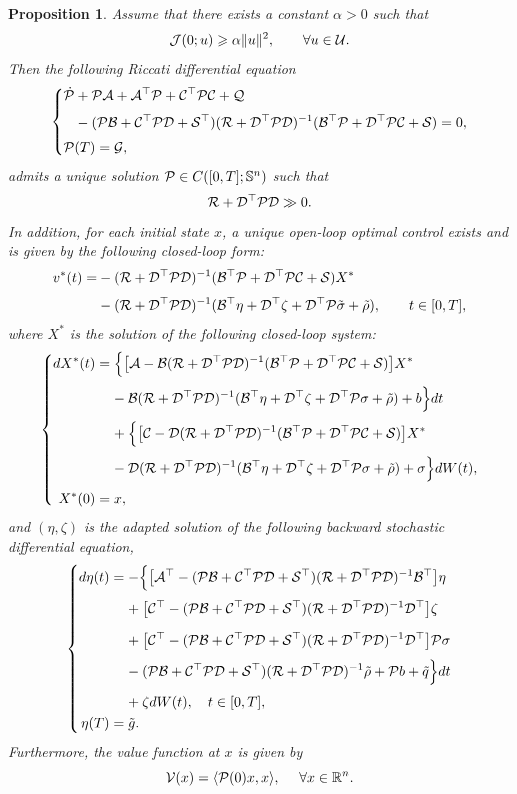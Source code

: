 \documentclass[11pt,times,twoside]{article}
\def\dbR{\mathbb{R}} \def\sR{\mathscr{R}} \def\fR{\mathfrak{R}} \def\cR{{\cal R}} \def\BR{{\bf R}} \def\Br{{\bf r}}
\def\dbS{\mathbb{S}} \def\sS{\mathscr{S}} \def\fS{\mathfrak{S}} \def\cS{{\cal S}} \def\BS{{\bf S}} \def\Bs{{\bf s}}
\def\ges{\geqslant}       \def\esssup{\mathop{\rm esssup}}   \def\[{\Big[}
\def\a{\alpha}        \def\G{\Gamma}   \def\g{\gamma}   \def\O{\Omega}   \def\o{\omega}
\def\bel{\begin{equation}\label}      \def\ee{\end{equation}}
\def\ba{\begin{aligned}}              \def\ea{\end{aligned}}
\newtheorem{proposition}[theorem]{Proposition}
\begin{document}
\begin{proposition}
Assume that there exists a constant $\a>0$ such that
%
\begin{equation}\label{2.1}
\cJ(0;u) \ges \a\|u\|^2,\qq\forall u\in\cU.
\end{equation}
%
Then the following Riccati differential equation
%
\bel{Riccati-SDE}\left\{\ba
\ds & \dot{\cP}+\cP\cA+\cA^{\top}\cP+\cC^{\top}\cP\cC+\cQ  \\
%
\ns\ds &\hp{\dot{\cP}} -(\cP\cB+\cC^{\top}\cP\cD+\cS^{\top})(\cR+\cD^{\top}\cP\cD)^{-1}
(\cB^{\top}\cP+\cD^{\top}\cP\cC+\cS)=0,\\
%
\ns\ds  & \cP(T)=\cG,
%
\ea\right.\ee
%
admits a unique solution $\cP\in C([0,T];\dbS^n)$ such that
%
$$\cR+\cD^{\top}\cP\cD\gg0.$$
%
In addition, for each initial state $x$, a unique open-loop optimal control exists and is given
by the following closed-loop form:
%
\begin{align*}
\ds v^*(t)=& -(\cR+\cD^{\top}\cP\cD)^{-1}(\cB^{\top}\cP+\cD^{\top}\cP\cC+\cS)X^*\\
\ns\ds        & -(\cR+\cD^{\top}\cP\cD)^{-1}(\cB^\top\eta
       +\cD^{\top}\zeta+\cD^{\top}\cP\tilde{\sigma}+\tilde{\rho}),\qq t\in[0,T],
\end{align*}
%
where $X^*$ is the solution of the following closed-loop system:
%
$$\left\{\ba
\ds dX^*(t) &=\Big\{\big[\cA-\cB(\cR+\cD^\top \cP\cD)^{-1}(\cB^\top \cP+\cD^\top \cP\cC+\cS)\big]X^*\\
%
\ns\ds &\hp{=\ } -\cB(\cR+\cD^{\top}\cP\cD)^{-1}
(\cB^\top\eta+\cD^{\top}\zeta+\cD^{\top}\cP\sigma+\tilde{\rho})+b\Big\}dt\\
%
\ns\ds &\hp{=\ } +\Big\{\big[\cC-\cD(\cR+\cD^\top \cP\cD)^{-1}(\cB^\top \cP
+\cD^\top \cP\cC+\cS)\big]X^*\\
%
\ns\ds &\hp{=\ } -\cD(\cR+\cD^{\top}\cP\cD)^{-1}
(\cB^\top\eta+\cD^{\top}\zeta+\cD^{\top}\cP\sigma+\tilde{\rho})+\sigma\Big\}dW(t),\\
%
\ns\ds X^*(0) &=x,
%
\ea\right.$$
%
and  $(\eta,\zeta)$ is the adapted solution of the following backward stochastic differential equation,
%
$$\left\{\ba
\ds d\eta(t) &= -\Big\{\big[\cA^\top-(\cP\cB+\cC^\top \cP\cD+\cS^\top)(\cR
+\cD^\top \cP\cD)^{-1}\cB^\top\big]\eta\\
%
\ns\ds &\hp{=\ } +\big[\cC^\top-(\cP\cB+\cC^\top \cP\cD+\cS^\top)(\cR
+\cD^\top \cP\cD)^{-1}\cD^\top\big]\zeta\\
%
\ns\ns\ds &\hp{=\ } +\big[\cC^\top-(\cP\cB+\cC^\top \cP\cD+\cS^\top)
(\cR+\cD^\top \cP\cD)^{-1}\cD^\top\big]\cP\sigma\\
%
\ns\ds &\hp{=\ } -(\cP\cB+\cC^\top \cP\cD+\cS^\top)(\cR+\cD^\top \cP\cD)^{-1}\tilde{\rho}
+\cP b+\tilde{q}\Big\}dt \\
%
\ns\ds &\hp{=\ } + \zeta dW(t),\q t\in[0,T],\\
%
\eta(T) &=\tilde{g}.
%
\ea\right.$$
%
Furthermore, the value function at $x$ is given by
%
$$\cV(x)=\lan \cP(0)x,x\ran ,\q~\forall x\in\dbR^n.$$
%
\end{proposition}
\end{document}
